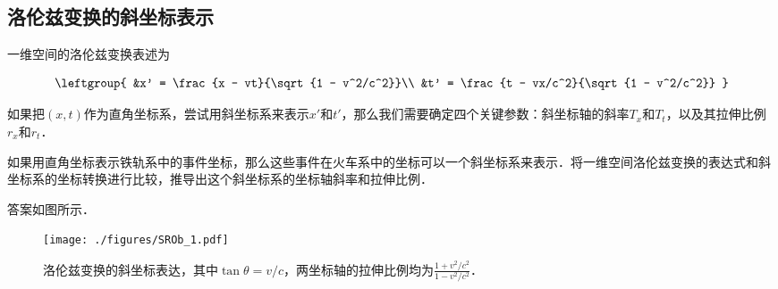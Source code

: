 \subsection{洛伦兹变换的斜坐标表示}

一维空间的洛伦兹变换表述为

\begin{equation}\label{SROb_eq1}
\leftgroup{
&x' = \frac{x - vt}{\sqrt{1 - v^2/c^2}}\\

&t' = \frac{t - vx/c^2}{\sqrt{1 - v^2/c^2}}
}
\end{equation}

如果把$(x,t)$作为直角坐标系，尝试用斜坐标系来表示$x'$和$t'$，那么我们需要确定四个关键参数：斜坐标轴的斜率$T_x$和$T_t$，以及其拉伸比例$r_x$和$r_t$．

\begin{exercise}{}

如果用直角坐标表示铁轨系中的事件坐标，那么这些事件在火车系中的坐标可以一个斜坐标系来表示．将一维空间洛伦兹变换的表达式和斜坐标系的坐标转换进行比较，推导出这个斜坐标系的坐标轴斜率和拉伸比例．

\end{exercise}

答案如图所示．

\begin{figure}[ht]
\centering
\texttt{[image: ./figures/SROb\_1.pdf]}
\caption{洛伦兹变换的斜坐标表达，其中$\tan{\theta}=v/c$，两坐标轴的拉伸比例均为$\frac{1+v^2/c^2}{1-v^2/c^2}$．} \label{SROb_fig1}
\end{figure}




